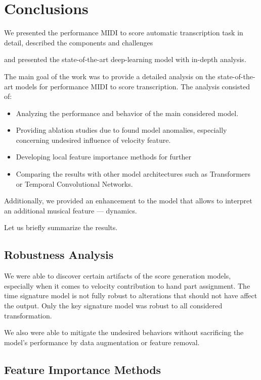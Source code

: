 \chapter{Conclusions}

We presented the performance MIDI to score automatic transcription task in detail, described the components and challenges 

and presented the state-of-the-art deep-learning model with in-depth analysis.

The main goal of the work was to provide a detailed analysis on the state-of-the-art models for performance MIDI to score transcription. The analysis consisted of: \begin{itemize}
	\item Analyzing the performance and behavior of the main considered model.
	\item Providing ablation studies due to found model anomalies, especially concerning undesired influence of velocity feature.
	\item Developing local feature importance methods for further 
	\item Comparing the results with other model architectures such as Transformers or Temporal Convolutional Networks.
\end{itemize}

Additionally, we provided an enhancement to the model that allows to interpret an additional musical feature --- dynamics. 

Let us briefly summarize the results.

\section{Robustness Analysis}

We were able to discover certain artifacts of the score generation models, especially when it comes to velocity contribution to hand part assignment. The time signature model is not fully robust to alterations that should not have affect the output. Only the key signature model was robust to all considered transformation.

We also were able to mitigate the undesired behaviors without sacrificing the model's performance by data augmentation or feature removal.

\section{Feature Importance Methods}

